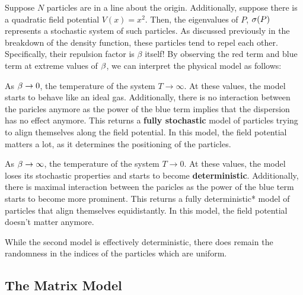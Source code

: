 
Suppose $N$ particles are in a line about the origin. Additionally, suppose there is a quadratic field potential $V(x) = x^2$.
Then, the eigenvalues of $P$, $\sigma(P)$ represents a stochastic system of such particles. As discussed previously in the breakdown of the density function,
these particles tend to repel each other. Specifically, their repulsion factor is $\beta$ itself! By observing the red term and blue term at extreme values of $\beta$,
we can interpret the physical model as follows:
\medskip

 As $\beta \to 0$, the temperature of the system $T \to \infty$.
At these values, the model starts to behave like an ideal gas.
Additionally, there is no interaction between the paricles anymore as the power of the blue term implies that the dispersion has no effect anymore. This returns a \textbf{fully stochastic} model of particles trying to align themselves along the field potential. In this model, the field potential matters a lot, as it determines the positioning of the particles.

\bigskip

 As $\beta \to \infty$, the temperature of the system $T \to 0$.
At these values, the model loses its stochastic properties and starts to become \textbf{deterministic}.
Additionally, there is maximal interaction between the paricles as the power of the blue term starts to become more prominent. This returns a fully deterministic*
model of particles that align themselves equidistantly. In this model, the field potential doesn't matter anymore.

\medskip

\begin{remark}
While the second model is effectively deterministic, there does remain the randomness in the indices of the particles which are uniform.
\end{remark}

\newpage
\subsection{The Matrix Model}

